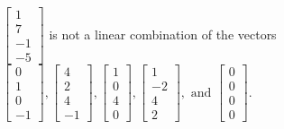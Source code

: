\begin{exercise}
\begin{exerciseStatement}
  \end{exerciseStatement}
  \begin{exerciseAnswer}
   \(\left[\begin{array}{c}
1 \\
7 \\
-1 \\
-5
\end{array}\right]\) 
  	 is not  
	a linear combination of the vectors \(\left[\begin{array}{c}
0 \\
1 \\
0 \\
-1
\end{array}\right] , \left[\begin{array}{c}
4 \\
2 \\
4 \\
-1
\end{array}\right] , \left[\begin{array}{c}
1 \\
0 \\
4 \\
0
\end{array}\right] , \left[\begin{array}{c}
1 \\
-2 \\
4 \\
2
\end{array}\right] , \text{ and } \left[\begin{array}{c}
0 \\
0 \\
0 \\
0
\end{array}\right]\).

	
  


  \end{exerciseAnswer}
\end{exercise}